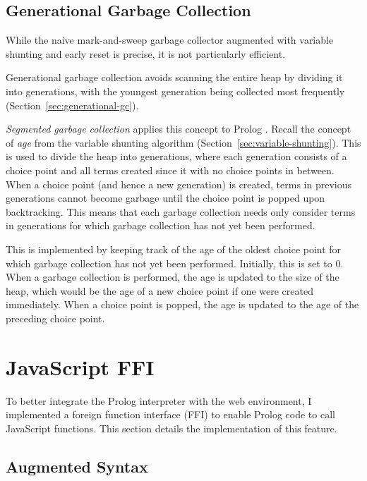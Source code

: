 \subsection{Generational Garbage Collection}

\label{sec:implementation-generational-gc}

While the naive mark-and-sweep garbage collector augmented with variable shunting and early reset is precise, it is not particularly efficient.

Generational garbage collection avoids scanning the entire heap by dividing it into generations, with the youngest generation being collected most frequently (Section~\ref{sec:generational-gc}).

\emph{Segmented garbage collection} applies this concept to Prolog \cite{applebyGarbargecollectionProlog1988}. Recall the concept of \emph{age} from the variable shunting algorithm (Section~\ref{sec:variable-shunting}). This is used to divide the heap into generations, where each generation consists of a choice point and all terms created since it with no choice points in between. When a choice point (and hence a new generation) is created, terms in previous generations cannot become garbage until the choice point is popped upon backtracking. This means that each garbage collection needs only consider terms in generations for which garbage collection has not yet been performed.

This is implemented by keeping track of the age of the oldest choice point for which garbage collection has not yet been performed. Initially, this is set to 0. When a garbage collection is performed, the age is updated to the size of the heap, which would be the age of a new choice point if one were created immediately. When a choice point is popped, the age is updated to the age of the preceding choice point.


\section{JavaScript FFI}

\label{sec:js-ffi}

To better integrate the Prolog interpreter with the web environment, I implemented a foreign function interface (FFI) to enable Prolog code to call JavaScript functions. This section details the implementation of this feature.

\subsection{Augmented Syntax}

